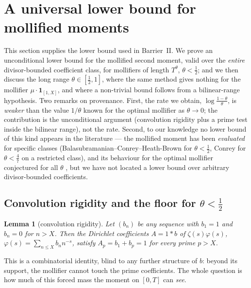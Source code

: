 \documentclass[11pt]{amsart}
\theoremstyle{plain}
\newtheorem{lemma}[theorem]{Lemma}
\theoremstyle{definition}
\theoremstyle{remark}
\begin{document}
\section{A universal lower bound for mollified moments}\label{sec:floor}

This section supplies the lower bound used in Barrier~II. We prove an unconditional lower bound for the mollified second moment, valid over the \emph{entire} divisor-bounded coefficient class, for mollifiers of length $T^\theta$, $\theta<\tfrac12$; and we then discuss the long range $\theta\in[\tfrac12,1]$, where the same method gives nothing for the mollifier $\mu\cdot\mathbf 1_{[1,X]}$, and where a non-trivial bound follows from a bilinear-range hypothesis. Two remarks on provenance. First, the rate we obtain, $\log\frac{1-\theta}{\theta}$, is \emph{weaker} than the value $1/\theta$ known for the optimal mollifier \cite{BCHB1985,Conrey1989} as $\theta\to0$; the contribution is the unconditional argument (convolution rigidity plus a prime test inside the bilinear range), not the rate. Second, to our knowledge no lower bound of this kind appears in the literature --- the mollified moment has been \emph{evaluated} for specific classes (Balasubramanian--Conrey--Heath-Brown \cite{BCHB1985} for $\theta<\tfrac12$, Conrey \cite{Conrey1989} for $\theta<\tfrac47$ on a restricted class), and its behaviour for the optimal mollifier conjectured for all $\theta$ \cite{Farmer1993,BettinGonek2017}, but we have not located a lower bound over arbitrary divisor-bounded coefficients.

\subsection{Convolution rigidity and the floor for $\theta<\tfrac12$}

\begin{lemma}[convolution rigidity]\label{lem:rigidity}
Let $(b_n)$ be any sequence with $b_1=1$ and $b_n=0$ for $n>X$. Then the Dirichlet coefficients $A=1*b$ of $\zeta(s)\varphi(s)$, $\varphi(s)=\sum_{n\le X}b_nn^{-s}$, satisfy $A_p=b_1+b_p=1$ for \emph{every} prime $p>X$.
\end{lemma}

This is a combinatorial identity, blind to any further structure of $b$: beyond its support, the mollifier cannot touch the prime coefficients. The whole question is how much of this forced mass the moment on $[0,T]$ can \emph{see}.
\end{document}
